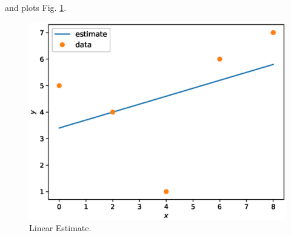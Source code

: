 \documentclass[journal,12pt,twocolumn]{IEEEtran}
\begin{document}
%
and plots Fig. \ref{fig:ls_line}.

\begin{figure}[!h]
\centering
\includegraphics[width=\columnwidth]{./figs/ls_line.eps}
\caption{Linear Estimate.}
\label{fig:ls_line}
\end{figure}
\end{document}
